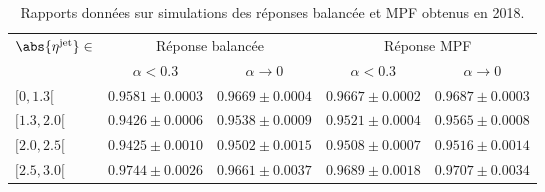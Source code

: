 \begin{table}[h]
\centering
\begin{tabular}{lcccc}
\toprule
\multirow{2}{*}{$\abs{\eta^\text{jet}}\in$} & \multicolumn{2}{c}{Réponse balancée} & \multicolumn{2}{c}{Réponse MPF} \\
\cmidrule(lr){2-3}\cmidrule(lr){4-5}
 & $\alpha<\num{0.3}$ & $\alpha\to0$ & $\alpha<\num{0.3}$ & $\alpha\to0$\\
\midrule
$[\num{0}, \num{1.3}[$ & $\num{0.9581}\pm\num{0.0003}$ & $\num{0.9669}\pm\num{0.0004}$ & $\num{0.9667}\pm\num{0.0002}$ & $\num{0.9687}\pm\num{0.0003}$ \\
$[\num{1.3}, \num{2.0}[$ & $\num{0.9426}\pm\num{0.0006}$ & $\num{0.9538}\pm\num{0.0009}$ & $\num{0.9521}\pm\num{0.0004}$ & $\num{0.9565}\pm\num{0.0008}$ \\
$[\num{2.0}, \num{2.5}[$ & $\num{0.9425}\pm\num{0.0010}$ & $\num{0.9502}\pm\num{0.0015}$ & $\num{0.9508}\pm\num{0.0007}$ & $\num{0.9516}\pm\num{0.0014}$ \\
$[\num{2.5}, \num{3.0}[$ & $\num{0.9744}\pm\num{0.0026}$ & $\num{0.9661}\pm\num{0.0037}$ & $\num{0.9689}\pm\num{0.0018}$ & $\num{0.9707}\pm\num{0.0034}$ \\
\bottomrule
\end{tabular}
\caption{Rapports données sur simulations des réponses balancée et MPF obtenus en 2018.}
\label{tab-responses_recap_table_2018ABCD}
\end{table}